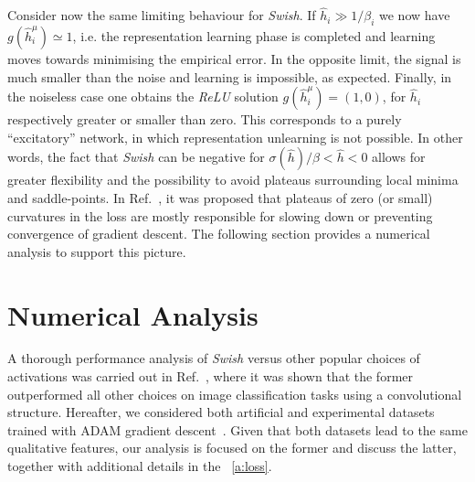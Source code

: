 \documentclass{article}
\begin{document}
Consider now the same limiting behaviour for {\it Swish}. If $\hat{h}_i \gg 1/\beta_i$ we now have $g(\hat{h}^{\mu}_i)\simeq 1$, i.e. the representation learning phase is completed and learning moves towards minimising the empirical error. In the opposite limit, the signal is much smaller than the noise and learning is impossible, as expected. Finally, in the noiseless case one obtains the {\it ReLU} solution $g(\hat{h}^{\mu}_i) = (1, 0) $, for $\hat{h}_i $ respectively greater or smaller than zero. This corresponds to a purely ``excitatory'' network, in which representation unlearning is not possible. In other words, the fact that {\it Swish} can be negative for $\sigma(\hat{h})/\beta <\hat{h}<0$ allows for greater flexibility and the possibility to avoid plateaus surrounding local minima and saddle-points. In Ref.~\cite{dauphin}, it was proposed that plateaus of zero (or small) curvatures in the loss are mostly responsible for slowing down or preventing convergence of gradient descent. The following section provides a numerical analysis to support this picture.
%
\section{Numerical Analysis}
%
A thorough performance analysis of {\it Swish} versus other popular choices of activations was carried out in Ref.~\cite{prajit}, where it was shown that the former outperformed all other choices on image classification tasks using a convolutional structure.%
Hereafter,  we considered both artificial and experimental datasets trained with ADAM gradient descent~\cite{adam}. 
Given that both datasets lead to the same qualitative features, our analysis is focused on the former and discuss the latter, together with additional details in the ~\eqref{a:loss}.
\end{document}
